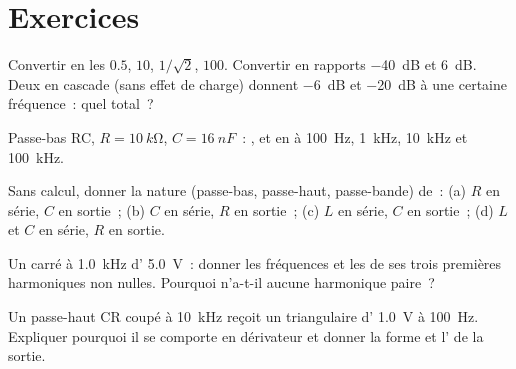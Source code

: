 \section{Exercices}

\begin{exercise}[$\star$]\label{exo:b1:filters-transfer-functions:1}
Convertir en  les  $0.5$, $10$, $1/\sqrt2$, $100$.
Convertir en rapports \qty{-40}{dB} et \qty{+6}{dB}. Deux  en
cascade (sans effet de charge) donnent \qty{-6}{dB} et \qty{-20}{dB} à
une certaine fréquence~: quel  total~?
\end{exercise}

\begin{exercise}[$\star$]\label{exo:b1:filters-transfer-functions:2}
Passe-bas RC, $R = \qty{10}{k\ohm}$, $C = \qty{16}{nF}$~: , et  en  à \qty{100}{Hz}, \qty{1}{kHz}, \qty{10}{kHz}
et \qty{100}{kHz}.
\end{exercise}

\begin{exercise}[$\star$]\label{exo:b1:filters-transfer-functions:3}
Sans calcul, donner la nature (passe-bas, passe-haut, passe-bande) de~:
(a) $R$ en série, $C$ en sortie~; (b) $C$ en série, $R$ en sortie~;
(c) $L$ en série, $C$ en sortie~; (d) $L$ et $C$ en série, $R$ en sortie.
\end{exercise}

\begin{exercise}[$\star$]\label{exo:b1:filters-transfer-functions:4}
Un  carré à \qty{1.0}{kHz} d' \qty{5.0}{V}~: donner les
fréquences et les  de ses trois premières harmoniques non
nulles. Pourquoi n'a-t-il aucune harmonique paire~?
\end{exercise}

\begin{exercise}[$\star\star$]\label{exo:b1:filters-transfer-functions:5}
Un passe-haut CR coupé à \qty{10}{kHz} reçoit un  triangulaire
d' \qty{1.0}{V} à \qty{100}{Hz}. Expliquer pourquoi il se
comporte en dérivateur et donner la forme et l' de la sortie.
\end{exercise}

